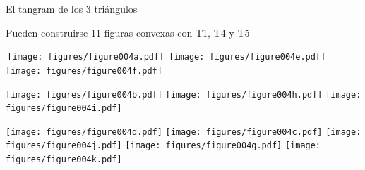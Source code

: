 \documentclass[14pt,aspectratio=169,usenames,dvipsnames]{beamer}
\begin{document}

    \begin{frame}{El tangram de los 3 triángulos}
        \begin{center}
            Pueden construirse 11 figuras convexas con T1, T4 y T5

            \bigskip \bigskip

            \;\,\texttt{[image: figures/figure004a.pdf]}\,\;\qquad
            \texttt{[image: figures/figure004e.pdf]}\qquad
            \texttt{[image: figures/figure004f.pdf]}\\

            \bigskip\medskip

            \;\;\texttt{[image: figures/figure004b.pdf]}\qquad
            \texttt{[image: figures/figure004h.pdf]}\qquad
            \texttt{[image: figures/figure004i.pdf]}\\

            \bigskip\smallskip

            \texttt{[image: figures/figure004d.pdf]}\quad
            \texttt{[image: figures/figure004c.pdf]}
            \texttt{[image: figures/figure004j.pdf]}\!\!
            \texttt{[image: figures/figure004g.pdf]}\quad
            \texttt{[image: figures/figure004k.pdf]}\\

            \bigskip\bigskip
        \end{center}
    \end{frame}

\end{document}
